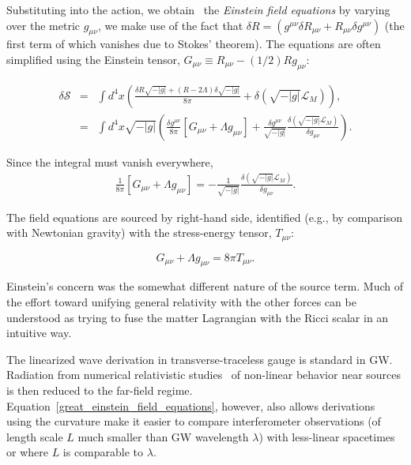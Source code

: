 Substituting into the action, we obtain~\cite{Carroll1997} the \textit{Einstein field equations} by varying over the metric $g_{\mu\nu}$, we make use of the fact that $\delta R = (g^{\mu\nu} \delta R_{\mu\nu} + R_{\mu\nu} \delta g^{\mu\nu})$ (the first term of which vanishes due to Stokes' theorem).
The equations are often simplified using the Einstein tensor, $G_{\mu\nu} \equiv R_{\mu\nu} - (1/2)R g_{\mu\nu}$:

\begin{eqnarray}
\delta \mathcal{S} &=& \int d^4 x \left( \frac{\delta R \sqrt{-|g|} + (R-2\Lambda)\delta \sqrt{-|g|}}{8\pi}+ \delta (\sqrt{-|g|}\mathcal{L}_M)\right), \\
 &=& \int d^4 x \sqrt{-|g|}\left( \frac{\delta g^{\mu\nu}}{8\pi} \left[ G_{\mu\nu} + \Lambda g_{\mu\nu} \right]
 + \frac{\delta g^{\mu \nu}}{\sqrt{-|g|}} \frac{\delta (\sqrt{-|g|}\mathcal{L}_M)}{\delta g_{\mu\nu}} \right).
\end{eqnarray}

\noindent Since the integral must vanish everywhere,
\begin{eqnarray}
\frac{1}{8\pi} \left[G_{\mu\nu} + \Lambda g_{\mu\nu} \right] = -\frac{1}{\sqrt{-|g|}}\frac{\delta (\sqrt{-|g|}\mathcal{L}_M)}{\delta g_{\mu\nu}}.
\end{eqnarray}

\noindent The field equations are sourced by right-hand side, identified (e.g., by comparison with Newtonian gravity) with the stress-energy tensor, $T_{\mu\nu}$:

\begin{equation}
G_{\mu\nu} + \Lambda g_{\mu\nu} = 8 \pi T_{\mu\nu}.
\label{great_einstein_field_equations}
\end{equation}

Einstein's concern was the somewhat different nature of the source term.
Much of the effort toward unifying general relativity with the other forces can be understood as trying to fuse the matter Lagrangian with the Ricci scalar in an intuitive way.

\noindent The linearized wave derivation in transverse-traceless gauge is standard in GW. Radiation from numerical relativistic studies~\cite{FarrThesis} of non-linear behavior near sources is then reduced to the far-field regime. Equation~\ref{great_einstein_field_equations}, however, also allows derivations~\cite{KoopFinn2014} using the curvature make it easier to compare interferometer observations (of length scale $L$ much smaller than GW wavelength $\lambda$) with less-linear spacetimes or where $L$ is comparable to $\lambda$.

